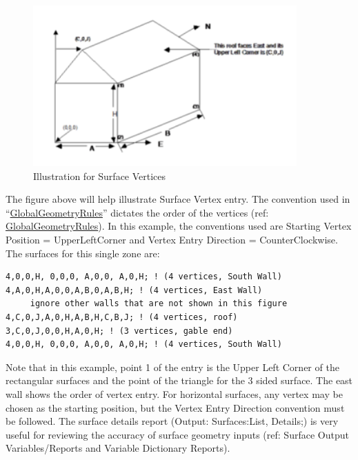 \begin{callout}
\end{callout}

\begin{figure}[hbtp] %
\centering
\includegraphics[width=0.9\textwidth, height=0.9\textheight, keepaspectratio=true]{media/image055.png}
\caption{Illustration for Surface Vertices \protect \label{fig:illustration-for-surface-vertices}}
\end{figure}

The figure above will help illustrate Surface Vertex entry. The convention used in ``\hyperref[globalgeometryrules]{GlobalGeometryRules}'' dictates the order of the vertices (ref: \hyperref[globalgeometryrules]{GlobalGeometryRules}). In this example, the conventions used are Starting Vertex Position = UpperLeftCorner and Vertex Entry Direction = CounterClockwise. The surfaces for this single zone are:

\begin{lstlisting}
4,0,0,H, 0,0,0, A,0,0, A,0,H; ! (4 vertices, South Wall)
4,A,0,H,A,0,0,A,B,0,A,B,H; ! (4 vertices, East Wall)
     ignore other walls that are not shown in this figure
4,C,0,J,A,0,H,A,B,H,C,B,J; ! (4 vertices, roof)
3,C,0,J,0,0,H,A,0,H; ! (3 vertices, gable end)
4,0,0,H, 0,0,0, A,0,0, A,0,H; ! (4 vertices, South Wall)
\end{lstlisting}

Note that in this example, point 1 of the entry is the Upper Left Corner of the rectangular surfaces and the point of the triangle for the 3 sided surface. The east wall shows the order of vertex entry. For horizontal surfaces, any vertex may be chosen as the starting position, but the Vertex Entry Direction convention must be followed. The surface details report (Output: Surfaces:List, Details;) is very useful for reviewing the accuracy of surface geometry inputs (ref: Surface Output Variables/Reports and Variable Dictionary Reports).

